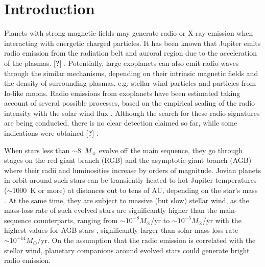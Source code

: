 \documentclass{emulateapj}
\def\memoYF#1{\color{red}$[${\bf #1}$]$ \color{black}}
\begin{document}


\section{Introduction}
\label{sec:intro}



Planets with strong magnetic fields may generate radio or X-ray emission when interacting with energetic charged particles. 
It has been known that Jupiter emits radio emission from the radiation belt and auroral region due to the acceleration of the plasmas. \memoYF{?}.
Potentially, large exoplanets can also emit radio waves through the similar mechanisms, depending on their intrinsic magnetic fields and the density of surrounding plasmas, e.g. stellar wind particles and particles from Io-like moons. 
Radio emissions from exoplanets have been estimated taking account of several possible processes, based on the empirical scaling of the radio intensity with the solar wind flux \citep{zarka2001, griebmeier2007, hallinan_et_al2013, noyola2014}.
Although the search for these radio signatures are being conducted, there is no clear detection claimed so far, while some indications were obtained \memoYF{?} \citep{lecavelier_et_al2013}. 


When stars less than $\sim$8~$M_\sun$ evolve off the main sequence,
they go through stages on the red-giant branch (RGB) and the
asymptotic-giant branch (AGB) where their radii and luminosities increase by orders of magnitude. 
Jovian planets in orbit around such stars can be transiently heated to hot-Jupiter temperatures ($\sim$1000~K or more) at distances out to tens of AU, depending on the star's mass \citep{spiegel+madhusudhan2012}. 
At the same time, they are subject to massive (but slow) stellar wind, as the mass-loss rate of such evolved stars are significantly higher than the main-sequence counterparts, ranging from $\sim  10^{-8} M_{\odot }$/yr to $\sim  10^{-5} M_{\odot }$/yr with the highest values for AGB stars \citep[e.g.,][]{reimers1975, schild1989, vassiliadis1993, schoier2001, vanloon2005}, significantly larger than solar mass-loss rate $\sim 10^{-14}M_{\odot }$/yr. 
On the assumption that the radio emission is correlated with the stellar wind, planetary companions around evolved stars could generate bright radio emission.
\end{document}
